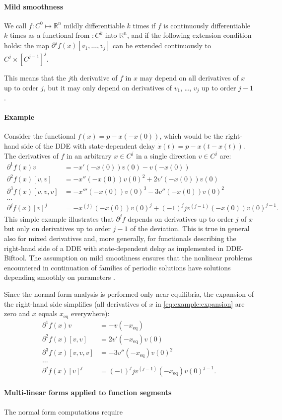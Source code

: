 \documentclass[11pt]{scrartcl}
\newcommand{\xeq}{x_\mathrm{eq}}
\newcommand{\R}{\mathbb{R}}
\begin{document}
\paragraph{Mild smoothness} We call $f:C^0\mapsto\R^n$ mildly
differentiable $k$ times if $f$ is continuously differentiable $k$
times as a functional from $:C^k$ into $\R^n$, and if the following
extension condition holds: the map $\partial^jf(x)[v_1,\ldots,v_j]$
can be extended continuously to $C^j\times [C^{j-1}]^j$.

This means that the $j$th derivative of $f$ in $x$ may depend on all
derivatives of $x$ up to order $j$, but it may only depend on
derivatives of $v_1$, \ldots, $v_j$ up to order $j-1$.
\paragraph{Example}
Consider the functional $f(x)=p-x(-x(0))$, which would be the
right-hand side of the DDE with state-dependent delay $\dot
x(t)=p-x(t-x(t))$. The derivatives of $f$ in an arbitrary
$x\in C^j$ in a single direction $v\in C^j$ are:
\begin{equation}
\begin{aligned}
\partial^1f(x)v&=-x'(-x(0))v(0)-v(-x(0))\\
\partial^2f(x)[v,v]&=-x''(-x(0))v(0)^2+2v'(-x(0))v(0)\\
\partial^3f(x)[v,v,v]&=-x'''(-x(0))v(0)^3-3v''(-x(0))v(0)^2\\
\ldots\\
\partial^jf(x)[v]^j&=-x^{(j)}(-x(0))v(0)^j+(-1)^jjv^{(j-1)}(-x(0))v(0)^{j-1}\mbox{.}
\end{aligned}\label{eq:example:expansion}
\end{equation}
This simple example illustrates that $\partial^jf$ depends on
derivatives up to order $j$ of $x$ but only on derivatives up to order
$j-1$ of the deviation. This is true in general also for mixed
derivatives and, more generally, for functionals describing the
right-hand side of a DDE with state-dependent delay as implemented in
DDE-Biftool. The assumption on mild smoothness ensures that the
nonlinear problems encountered in continuation of families of periodic
solutions have solutions depending smoothly on parameters \cite{S12}.

Since the normal form analysis is performed only near equilibria, the
expansion of the right-hand side simplifies (all derivatives of $x$ in
\eqref{eq:example:expansion} are zero and $x$ equals $\xeq$ everywhere):
\begin{equation}
\begin{aligned}
\partial^1f(x)v&=-v(-\xeq)\\
\partial^2f(x)[v,v]&=2v'(-\xeq)v(0)\\
\partial^3f(x)[v,v,v]&=-3v''(-\xeq)v(0)^2\\
\ldots\\
\partial^jf(x)[v]^j&=(-1)^jjv^{(j-1)}(-\xeq)v(0)^{j-1}\mbox{.}
\end{aligned}\label{eq:example:equilibrium}
\end{equation}

\paragraph{Multi-linear forms applied to function segments}
The normal form computations require
 
\end{document}
